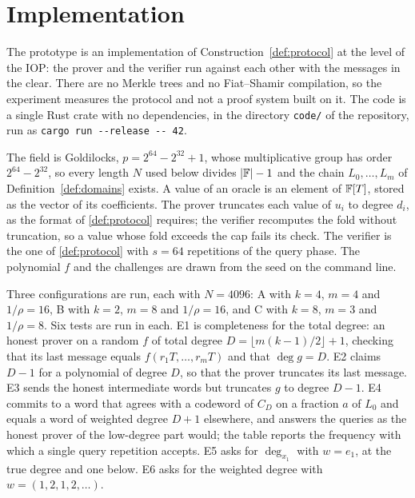\section{Implementation}\label{sec:impl}

The prototype is an implementation of Construction~\ref{def:protocol} at the level of the IOP: the prover
and the verifier run against each other with the messages in the clear.
There are no Merkle trees and no Fiat--Shamir compilation, so the experiment measures the
protocol and not a proof system built on it. The code is a single Rust crate with no
dependencies, in the directory \texttt{code/} of the repository, run as
\texttt{cargo run -{}-release -{}- 42}.

The field is Goldilocks, $p=2^{64}-2^{32}+1$, whose multiplicative group has order
$2^{64}-2^{32}$, so every length $N$ used below divides $|\mathbb{F}|-1$ and the chain
$L_0,\dots,L_m$ of Definition~\ref{def:domains} exists. A value of an oracle is an element of $\mathbb{F}[T]$,
stored as the vector of its coefficients. The prover truncates each value of $u_i$ to
degree $d_i$, as the format of \cref{def:protocol} requires; the verifier recomputes the
fold without truncation, so a value whose fold exceeds the cap fails its check. The
verifier is the one of \cref{def:protocol} with $s=64$ repetitions of the query
phase. The polynomial $f$ and the challenges are drawn from the seed on the command line.

Three configurations are run, each with $N=4096$: A with $k=4$, $m=4$ and $1/\rho=16$, B with
$k=2$, $m=8$ and $1/\rho=16$, and C with $k=8$, $m=3$ and $1/\rho=8$. Six tests are run in
each. E1 is completeness for the total degree: an honest prover on a random $f$ of total
degree $D=\lfloor m(k-1)/2\rfloor+1$, checking that its last message equals
$f(r_1T,\dots,r_mT)$ and that $\deg g=D$. E2 claims $D-1$ for a polynomial of degree $D$, so
that the prover truncates its last message. E3 sends the honest intermediate words but
truncates $g$ to degree $D-1$. E4 commits to a word that agrees with a codeword of $C_D$ on a
fraction $a$ of $L_0$ and equals a word of weighted degree $D+1$ elsewhere, and answers the
queries as the honest prover of the low-degree part would; the table reports the frequency
with which a single query repetition accepts. E5 asks for $\deg_{x_1}$ with $w=e_1$, at the
true degree and one below. E6 asks for the weighted degree with $w=(1,2,1,2,\dots)$.

